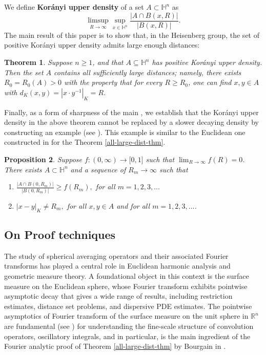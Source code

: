 \documentclass[11pt, reqno]{amsart}
\theoremstyle{plain}
\newtheorem{theorem}{Theorem}[section]
\newtheorem{proposition}[theorem]{Proposition}
\theoremstyle{remark}
\theoremstyle{example}
\theoremstyle{definition}
\numberwithin{equation}{section}
\begin{document}
We define {\textbf{Kor\'anyi upper density}} of a set $A\subset \mathbb H^n$ as 
\begin{equation} \limsup_{R \rightarrow \infty} \sup_{x \in \mathbb H^n}  \frac{ |A \cap B(x,R)|  }{|B(x,R)|}.\label{defn Koranyi density}
\end{equation}
The main result of this paper is to show that, in the Heisenberg group, the set of positive Kor\'anyi upper density admits large enough distances:
\begin{theorem} \label{all-large-dist-thm Hn}
Suppose $n \geq 1$, and that $A \subseteq \mathbb H^n$ has positive Kor\'anyi upper density. Then the set $A$ contains all sufficiently large distances; namely, there exists $R_0 = R_0(A) > 0$ with the property that for every $R \geq R_0$, one can find $x, y \in A$ with $d_K(x,y)=|x \cdot y^{-1}|_K = R$.
\end{theorem}
Finally, as a form of sharpness of the main , we establish that the Kor\'anyi upper density in the above theorem cannot be replaced by a slower decaying density by constructing an example (see ). This example is similar to the Euclidean one constructed in \cite{2020Rice} for the Theorem \ref{all-large-dist-thm}.
\begin{proposition}\label{prop:Example}
Suppose $f:(0,\infty)\rightarrow \mathbb [0,1]$ such that $\lim_{R\rightarrow \infty}f(R)=0$. There exists $A\subset \mathbb H^n$ and a sequence of $R_m\rightarrow \infty$ such that 
    \begin{enumerate}
    \item $\frac{|A\cap B(0, R_m)|}{|B(0, R_m)|}\geq f(R_m),$ for all $m=1,2,3, \dots$
    \item $|x-y|_K\neq R_m,$ for all $x,y\in A$ and  for all $m=1,2,3, \dots$.
    \end{enumerate}
    \end{proposition}
\subsection{On Proof techniques} The study of spherical averaging operators and their associated Fourier transforms has played a central role in Euclidean harmonic analysis and geometric measure theory. A foundational object in this context is the surface measure on the Euclidean sphere, whose Fourier transform exhibits pointwise asymptotic decay that gives a wide range of results, including restriction estimates, distance set problems, and dispersive PDE estimates. The pointwise asymptotics of Fourier transform of the surface measure on the unit sphere in $\mathbb R^n$ are fundamental (see \cite{Ste93}) for understanding the fine-scale structure of convolution operators, oscillatory integrals, and in particular, is the main ingredient of the Fourier analytic proof of Theorem \ref{all-large-dist-thm} by Bourgain in \cite{1986Bourgain}.
\end{document}

